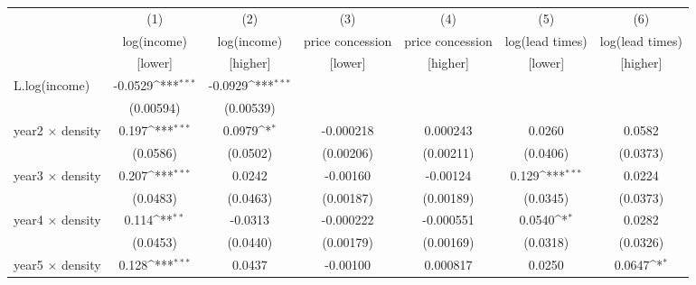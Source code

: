{
\def\sym#1{\ifmmode^{#1}\else\(^{#1}\)\fi}
\begin{tabular}{l*{6}{c}}
\toprule
            &\multicolumn{1}{c}{(1)}&\multicolumn{1}{c}{(2)}&\multicolumn{1}{c}{(3)}&\multicolumn{1}{c}{(4)}&\multicolumn{1}{c}{(5)}&\multicolumn{1}{c}{(6)}\\
            &\multicolumn{1}{c}{log(income)}&\multicolumn{1}{c}{log(income)}&\multicolumn{1}{c}{price concession}&\multicolumn{1}{c}{price concession}&\multicolumn{1}{c}{log(lead times)}&\multicolumn{1}{c}{log(lead times)}\\
            &\multicolumn{1}{c}{[lower]}&\multicolumn{1}{c}{[higher]}&\multicolumn{1}{c}{[lower]}&\multicolumn{1}{c}{[higher]}&\multicolumn{1}{c}{[lower]}&\multicolumn{1}{c}{[higher]}\\
\midrule
L.log(income) &     -0.0529\sym{***}&     -0.0929\sym{***}&                     &                     &                     &                     \\
            &   (0.00594)         &   (0.00539)         &                     &                     &                     &                     \\
\addlinespace
year2 $\times$ density&       0.197\sym{***}&      0.0979\sym{*}  &   -0.000218         &    0.000243         &      0.0260         &      0.0582         \\
            &    (0.0586)         &    (0.0502)         &   (0.00206)         &   (0.00211)         &    (0.0406)         &    (0.0373)         \\
\addlinespace
year3 $\times$ density&       0.207\sym{***}&      0.0242         &    -0.00160         &    -0.00124         &       0.129\sym{***}&      0.0224         \\
            &    (0.0483)         &    (0.0463)         &   (0.00187)         &   (0.00189)         &    (0.0345)         &    (0.0373)         \\
\addlinespace
year4 $\times$ density&       0.114\sym{**} &     -0.0313         &   -0.000222         &   -0.000551         &      0.0540\sym{*}  &      0.0282         \\
            &    (0.0453)         &    (0.0440)         &   (0.00179)         &   (0.00169)         &    (0.0318)         &    (0.0326)         \\
\addlinespace
year5 $\times$ density&       0.128\sym{***}&      0.0437         &    -0.00100         &    0.000817         &      0.0250         &      0.0647\sym{*}  \\

\end{tabular}}
